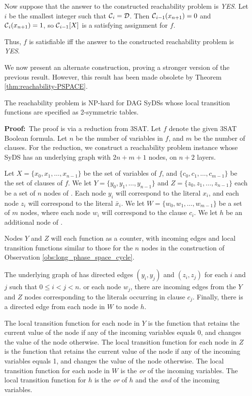Now suppose that the answer to the constructed reachability problem is {\em YES}.
Let $i$ be the smallest integer such that $\mbox{$\mathcal{C}$}_i= \mbox{$\mathcal{D}$}$. 
Then $\mbox{$\mathcal{C}$}_{i-1}(x_{n+1}) =0$ and $\mbox{$\mathcal{C}$}_i(x_{n+1}) = 1$,
so $\mbox{$\mathcal{C}$}_{i-1}[X]$ is a satisfying assignment for $f$.

Thus, $f$ is satisfiable iff the answer to the constructed reachability problem is {\em YES}. 
\QED

We now present an alternate construction, proving a stronger version of the previous result.
However, this result has been made obsolete by Theorem \ref{thm:reachability-PSPACE}.
 
\smallskip
\begin{theorem}\label{thm:reachability-NP-rsymm}
The reachability problem is NP-hard for DAG SyDSs 
whose local transition functions are specified as 2-symmetric tables.
\end{theorem}

\noindent
\textbf{Proof:}~The proof is via a reduction from 3SAT.
Let $f$ denote the given 3SAT Boolean formula.
Let $n$ be the number of variables in $f$, and $m$ be the number of clauses.
For the reduction, we construct a reachability problem instance whose SyDS \cals{} 
has an underlying graph with $2n+m+1$ nodes, on $n+2$ layers.

Let $X = \{x_0, x_1, \dots , x_{n-1}\}$ be the set of variables of $f$,
and $\{c_0, c_1, \dots , c_{m-1}\}$ be the set of clauses of $f$.
We let $Y = \{y_0, y_1, \dots , y_{n-1}\}$ and $Z = \{z_0, z_1, \dots , z_{n-1}\}$ 
each be a set of $n$ nodes of \cals{}.
Each node $y_i$ will correspond to the literal $x_i$,
and each node $z_i$ will correspond to the literal ${\bar x_i}$.
We let $W = \{w_0, w_1, \dots , w_{m-1}\}$ be a set of $m$ nodes,
where each node $w_i$ will correspond to the clause $c_i$.
We let $h$ be an additional node of \cals{}.

Nodes $Y$ and $Z$ will each function as a counter,
with incoming edges and local transition functions similar to those for
the $n$ nodes in the construction of Observation \ref{obs:long_phase_space_cycle}.

The underlying graph of \cals{} has directed edges
$(y_i, y_j)$ and $(z_i, z_j)$ for each $i$ and $j$ such that $0 \leq i < j < n$.
or each node $w_j$, there are incoming edges from the $Y$ and $Z$ nodes
corresponding to the literals occurring in clause $c_j$.
Finally, there is a directed edge from each node in $W$ to node $h$.

The local transition function for each node in $Y$ is the function 
that retains the current value of the node if any of the incoming variables equals 0,
and changes the value of the node otherwise.
The local transition function for each node in $Z$ is the function 
that retains the current value of the node if any of the incoming variables equals 1,
and changes the value of the node otherwise.
The local transition function for each node in $W$ is the {\em or} of the incoming variables.
The local transition function for $h$ is the {\em or} of $h$
and the {\em and} of the incoming variables.

